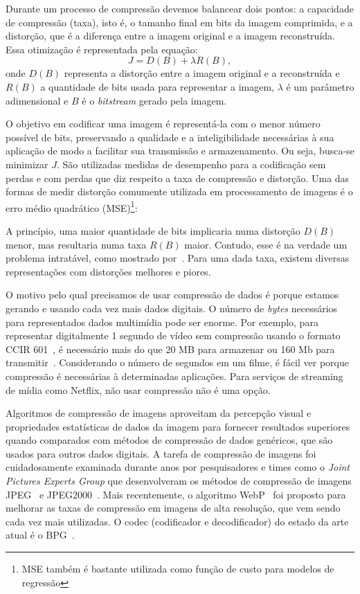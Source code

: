 Durante um processo de compressão devemos balancear dois pontos: a capacidade de compressão (taxa), isto é, o tamanho final em bits da imagem comprimida, e a distorção, que é a diferença entre a imagem original e a imagem reconstruída. Essa otimização é representada pela equação: $$ J = D(B) + \lambda R(B), $$ onde $D(B)$ representa a distorção entre a imagem original e a reconstruída e $R(B)$ a quantidade de bits usada para representar a imagem, $\lambda$ é um parâmetro adimensional e $B$ é o \textit{bitstream} gerado pela imagem.

O objetivo em codificar uma imagem é representá-la com o menor número possível de bits, preservando a qualidade e a inteligibilidade necessárias à sua aplicação de modo a facilitar sua transmissão e armazenamento. Ou seja, busca-se minimizar $J$. São utilizadas medidas de desempenho para a codificação sem perdas e com perdas que diz respeito a taxa de compressão e distorção. Uma das formas de medir distorção comumente utilizada em processamento de imagens é o erro médio quadrático (\acrshort{MSE})\footnote{MSE também é bastante utilizada como função de custo para modelos de regressão}: 
    
A princípio, uma maior quantidade de bits implicaria numa distorção $D(B)$ menor, mas resultaria numa taxa $R(B)$ maior. Contudo, esse é na verdade um problema intratável, como mostrado por~\cite{shoham1988efficient}. Para uma dada taxa, existem diversas representações com distorções melhores e piores.

O motivo pelo qual precisamos de usar compressão de dados é porque estamos gerando e usando cada vez mais dados digitais. O número de \textit{bytes} necessários para representados dados multimídia pode ser enorme. Por exemplo, para representar digitalmente 1 segundo de vídeo sem compressão usando o formato CCIR 601~\cite{sayood2017introduction}, é necessário mais do que 20 MB para armazenar ou 160 Mb para transmitir~\cite{sayood2017introduction}. Considerando o número de segundos em um filme, é fácil ver porque compressão é necessárias à determinadas aplicações. Para serviços de streaming de mídia como Netflix, não usar compressão não é uma opção.

Algoritmos de compressão de imagens aproveitam da percepção visual e propriedades estatísticas de dados da imagem para fornecer resultados superiores quando comparados com métodos de compressão de dados genéricos, que são usados para outros dados digitais. A tarefa de compressão de imagens foi cuidadosamente examinada durante anos por pesquisadores e times como o \textit{Joint Pictures Experts Group} que desenvolveram os métodos de compressão de imagens JPEG~\cite{jpeg1993} e JPEG2000~\cite{jpeg2000}. Mais recentemente, o algoritmo WebP~\cite{webp} foi proposto para melhorar as taxas de compressão em imagens de alta resolução, que vem sendo cada vez mais utilizadas. O codec (codificador e decodificador) do estado da arte atual é o BPG~\cite{bpg}.


